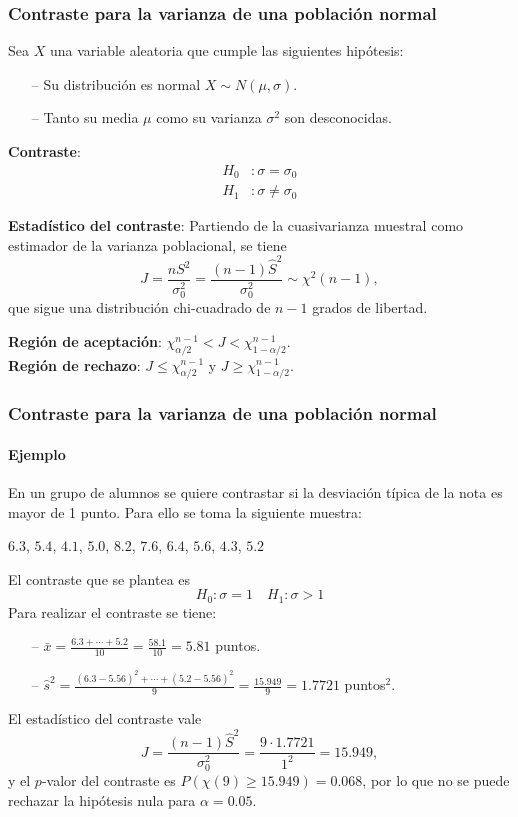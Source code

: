 \begin{frame}
\frametitle{Contraste para la varianza de una población normal}
Sea $X$ una variable aleatoria que cumple las siguientes hipótesis:
\begin{itemize}
\item[--] Su distribución es normal $X\sim N(\mu,\sigma)$.
\item[--] Tanto su media $\mu$ como su varianza $\sigma^2$ son desconocidas.
\end{itemize}
\textbf{Contraste}:
\begin{align*}
H_0 &: \sigma=\sigma_0\\
H_1 &: \sigma\neq \sigma_0
\end{align*}

\textbf{Estadístico del contraste}: Partiendo de la cuasivarianza muestral como estimador de la varianza poblacional, se tiene
\[
J=\frac{nS^2}{\sigma_0^2} = \frac{(n-1)\hat{S}^2}{\sigma_0^2}\sim \chi^2(n-1),
\]
que sigue una distribución chi-cuadrado de $n-1$ grados de libertad.

\textbf{Región de aceptación}: $\chi^{n-1}_{\alpha/2}< J < \chi^{n-1}_{1-\alpha/2}$.\\
\textbf{Región de rechazo}: $J\leq \chi^{n-1}_{\alpha/2}$ y $J\geq \chi^{n-1}_{1-\alpha/2}$.
\end{frame}


\begin{frame}
\frametitle{Contraste para la varianza de una población normal}
\framesubtitle{Ejemplo}
En un grupo de alumnos se quiere contrastar si la desviación típica de la nota es mayor de 1 punto.
Para ello se toma la siguiente muestra:
\begin{center}
$6.3$, $5.4$, $4.1$, $5.0$, $8.2$, $7.6$, $6.4$, $5.6$, $4.3$, $5.2$
\end{center}
El contraste que se plantea es
\[
H_0: \sigma=1 \quad H_1: \sigma>1
\]
Para realizar el contraste se tiene:
\begin{itemize}
\item[--] $\bar x = \frac{6.3+\cdots+5.2}{10}=\frac{58.1}{10}=5.81$ puntos.
\item[--] $\hat s^2 = \frac{(6.3-5.56)^2+\cdots+(5.2-5.56)^2}{9} = \frac{15.949}{9}=1.7721$ puntos$^2$.
\end{itemize}
El estadístico del contraste vale
\[
J= \frac{(n-1)\hat{S}^2}{\sigma_0^2} = \frac{9\cdot1.7721}{1^2} = 15.949,
\]
y el $p$-valor del contraste es $P(\chi(9)\geq 15.949) = 0.068$, por lo que no se puede rechazar la hipótesis nula para $\alpha=0.05$.
\end{frame}


